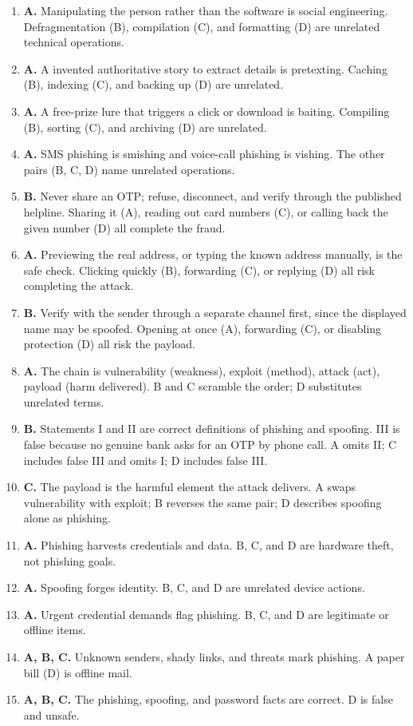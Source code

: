 \documentclass[11pt]{article}
\begin{document}
\begin{enumerate}[label=\textbf{Q\arabic*.}, leftmargin=*]
  habit, not a phishing sign. Urgency (A), a mismatched link (B), and a
  mismatched sender (C) are all genuine warning signs.
\item \textbf{A.} Manipulating the person rather than the software is
  social engineering. Defragmentation (B), compilation (C), and
  formatting (D) are unrelated technical operations.
\item \textbf{A.} A invented authoritative story to extract details is
  pretexting. Caching (B), indexing (C), and backing up (D) are
  unrelated.
\item \textbf{A.} A free-prize lure that triggers a click or download
  is baiting. Compiling (B), sorting (C), and archiving (D) are
  unrelated.
\item \textbf{A.} SMS phishing is smishing and voice-call phishing is
  vishing. The other pairs (B, C, D) name unrelated operations.
\item \textbf{B.} Never share an OTP; refuse, disconnect, and verify
  through the published helpline. Sharing it (A), reading out card
  numbers (C), or calling back the given number (D) all complete the
  fraud.
\item \textbf{A.} Previewing the real address, or typing the known
  address manually, is the safe check. Clicking quickly (B), forwarding
  (C), or replying (D) all risk completing the attack.
\item \textbf{B.} Verify with the sender through a separate channel
  first, since the displayed name may be spoofed. Opening at once (A),
  forwarding (C), or disabling protection (D) all risk the payload.
\item \textbf{A.} The chain is vulnerability (weakness), exploit
  (method), attack (act), payload (harm delivered). B and C scramble
  the order; D substitutes unrelated terms.
\item \textbf{B.} Statements I and II are correct definitions of
  phishing and spoofing. III is false because no genuine bank asks for
  an OTP by phone call. A omits II; C includes false III and omits I;
  D includes false III.
\item \textbf{C.} The payload is the harmful element the attack
  delivers. A swaps vulnerability with exploit; B reverses the same
  pair; D describes spoofing alone as phishing.

\item \textbf{A.} Phishing harvests credentials and data. B, C, and D are hardware theft, not phishing goals.
\item \textbf{A.} Spoofing forges identity. B, C, and D are unrelated device actions.
\item \textbf{A.} Urgent credential demands flag phishing. B, C, and D are legitimate or offline items.
\item \textbf{A, B, C.} Unknown senders, shady links, and threats mark phishing. A paper bill (D) is offline mail.
\item \textbf{A, B, C.} The phishing, spoofing, and password facts are correct. D is false and unsafe.
\end{enumerate}
\def\JKSSBLessonID{43}\def\JKSSBAnswers{1}
\end{document}
